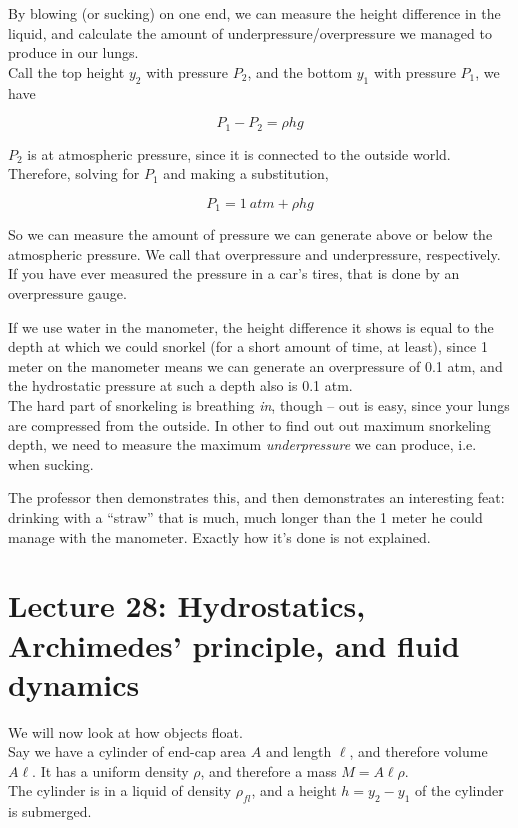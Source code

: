 By blowing (or sucking) on one end, we can measure the height difference in the liquid, and calculate the amount of underpressure/overpressure we managed to produce in our lungs.\\
Call the top height $y_2$ with pressure $P_2$, and the bottom $y_1$ with pressure $P_1$, we have

\begin{equation}
P_1 - P_2 = \rho h g
\end{equation}

$P_2$ is at atmospheric pressure, since it is connected to the outside world. Therefore, solving for $P_1$ and making a substitution,

\begin{equation}
P_1 = \SI{1}{atm} + \rho h g
\end{equation}

So we can measure the amount of pressure we can generate above or below the atmospheric pressure. We call that overpressure and underpressure, respectively.\\
If you have ever measured the pressure in a car's tires, that is done by an overpressure gauge.

If we use water in the manometer, the height difference it shows is equal to the depth at which we could snorkel (for a short amount of time, at least), since 1 meter on the manometer means we can generate an overpressure of 0.1 atm, and the hydrostatic pressure at such a depth also is 0.1 atm.\\
The hard part of snorkeling is breathing \emph{in}, though -- out is easy, since your lungs are compressed from the outside. In other to find out out maximum snorkeling depth, we need to measure the maximum \emph{underpressure} we can produce, i.e. when sucking.

The professor then demonstrates this, and then demonstrates an interesting feat: drinking with a ``straw'' that is much, much longer than the 1 meter he could manage with the manometer. Exactly how it's done is not explained.

\section{Lecture 28: Hydrostatics, Archimedes' principle, and fluid dynamics}

We will now look at how objects float.\\
Say we have a cylinder of end-cap area $A$ and length $\ell$, and therefore volume $A \ell$. It has a uniform density $\rho$, and therefore a mass $M = A \ell \rho$.\\
The cylinder is in a liquid of density $\rho_{fl}$, and a height $h = y_2 - y_1$ of the cylinder is submerged.

